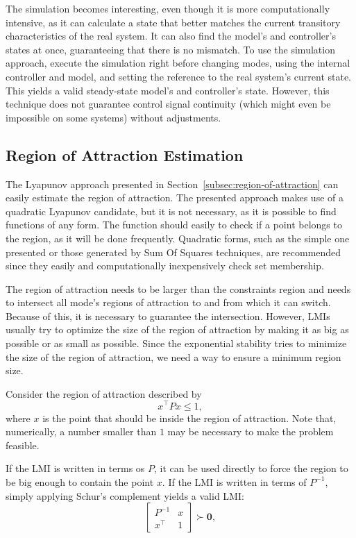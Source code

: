 The simulation becomes interesting, even though it is more computationally
intensive, as it can calculate a state that better matches the current
transitory characteristics of the real system. It can also find the model's and
controller's states at once, guaranteeing that there is no mismatch. To use the
simulation approach, execute the simulation right before changing modes, using
the internal controller and model, and setting the reference to the real
system's current state. This yields a valid steady-state model's and
controller's state. However, this technique does not guarantee control signal
continuity (which might even be impossible on some systems) without adjustments.

\subsection{Region of Attraction Estimation}%
\label{subsec:roa-estimation}

The Lyapunov approach presented in Section~\ref{subsec:region-of-attraction} can
easily estimate the region of attraction. The presented approach makes use of a
quadratic Lyapunov candidate, but it is not necessary, as it is possible to find
functions of any form. The function should easily to check if a point belongs to
the region, as it will be done frequently. Quadratic forms, such as the simple
one presented or those generated by Sum Of Squares techniques, are recommended
since they easily and computationally inexpensively check set membership.

The region of attraction needs to be larger than the constraints region and
needs to intersect all mode's regions of attraction to and from which it can
switch. Because of this, it is necessary to guarantee the intersection. However,
LMIs usually try to optimize the size of the region of attraction by making it
as big as possible or as small as possible. Since the exponential stability
tries to minimize the size of the region of attraction, we need a way to ensure
a minimum region size.

Consider the region of attraction described by
%
\begin{equation}
  x^{\top}Px \le{} 1,
\end{equation}
%
where \(x\) is the point that should be inside the region of attraction. Note
that, numerically, a number smaller than \(1\) may be necessary to make the
problem feasible.

If the LMI is written in terms os \(P\), it can be used directly to force the
region to be big enough to contain the point \(x\). If the LMI is written in
terms of \(P^{-1}\), simply applying Schur's complement yields a valid LMI:
%
\begin{equation}
  \label{eq:lmi-point-inside-roa}
  \begin{bmatrix}
    P^{-1}   & x \\
    x^{\top} & 1
  \end{bmatrix} \succ \mathbf{0},
\end{equation}

